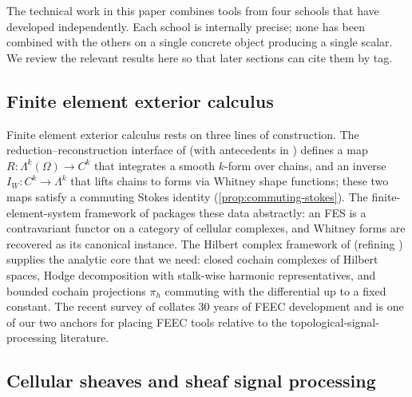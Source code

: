 
\noindent
The technical work in this paper combines tools from four schools
that have developed independently. Each school is internally precise;
none has been combined with the others on a single concrete object
producing a single scalar. We review the relevant results here so
that later sections can cite them by tag.

\subsection{Finite element exterior calculus}\label{subsec:related-feec}

Finite element exterior calculus rests on three lines of
construction. The reduction--reconstruction interface of
\cite{BochevHyman2006} (with antecedents in
\cite{Whitney1957,Bossavit1988}) defines a map
$R : \Lambda^k(\Omega) \to C^k$ that integrates a smooth $k$-form
over chains, and an inverse $I_W : C^k \to \Lambda^k$ that lifts
chains to forms via Whitney shape functions; these two maps satisfy a
commuting Stokes identity (\cref{prop:commuting-stokes}). The
finite-element-system framework of \cite{Christiansen2010} packages
these data abstractly: an FES is a contravariant functor on a
category of cellular complexes, and Whitney forms are recovered as
its canonical instance. The Hilbert complex framework of
\cite{AFW2010,FalkWinther2014} (refining
\cite{BruningLesch1992,AFW2006}) supplies the analytic core that we
need: closed cochain complexes of Hilbert spaces, Hodge decomposition
with stalk-wise harmonic representatives, and bounded cochain
projections $\pi_h$ commuting with the differential up to a fixed
constant. The recent survey of \cite{ChristiansenRapetti2025}
collates 30 years of FEEC development and is one of our two anchors
for placing FEEC tools relative to the topological-signal-processing
literature.

\subsection{Cellular sheaves and sheaf signal processing}\label{subsec:related-sheafsp}

